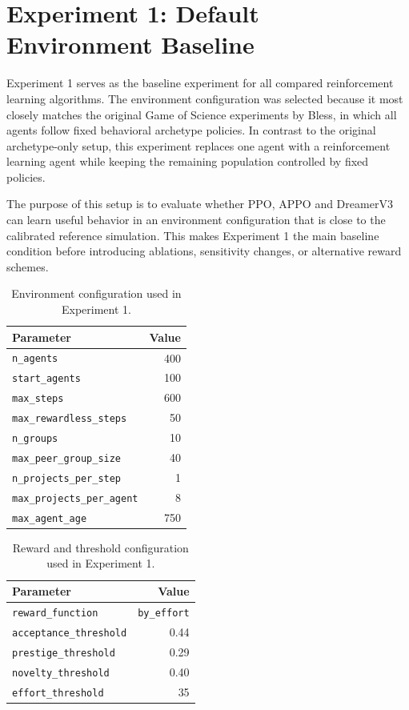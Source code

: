 \documentclass[english,bachelor]{hsluthesis}
\begin{document}
\section{Experiment 1: Default Environment Baseline}

Experiment 1 serves as the baseline experiment for all compared reinforcement learning algorithms. The environment configuration was selected because it most closely matches the original Game of Science experiments by Bless, in which all agents follow fixed behavioral archetype policies. In contrast to the original archetype-only setup, this experiment replaces one agent with a reinforcement learning agent while keeping the remaining population controlled by fixed policies.

The purpose of this setup is to evaluate whether PPO, APPO and DreamerV3 can learn useful behavior in an environment configuration that is close to the calibrated reference simulation. This makes Experiment 1 the main baseline condition before introducing ablations, sensitivity changes, or alternative reward schemes.

\begin{table}[H]
\centering
\begin{tabular}{l r}
\hline
Parameter & Value \\
\hline
\texttt{n\_agents} & 400 \\
\texttt{start\_agents} & 100 \\
\texttt{max\_steps} & 600 \\
\texttt{max\_rewardless\_steps} & 50 \\
\texttt{n\_groups} & 10 \\
\texttt{max\_peer\_group\_size} & 40 \\
\texttt{n\_projects\_per\_step} & 1 \\
\texttt{max\_projects\_per\_agent} & 8 \\
\texttt{max\_agent\_age} & 750 \\
\hline
\end{tabular}
\caption{Environment configuration used in Experiment 1.}
\label{tab:experiment1_env_config}
\end{table}

\begin{table}[H]
\centering
\begin{tabular}{l r}
\hline
Parameter & Value \\
\hline
\texttt{reward\_function} & \texttt{by\_effort} \\
\texttt{acceptance\_threshold} & 0.44 \\
\texttt{prestige\_threshold} & 0.29 \\
\texttt{novelty\_threshold} & 0.40 \\
\texttt{effort\_threshold} & 35 \\
\hline
\end{tabular}
\caption{Reward and threshold configuration used in Experiment 1.}
\label{tab:experiment1_reward_config}
\end{table}
\end{document}
